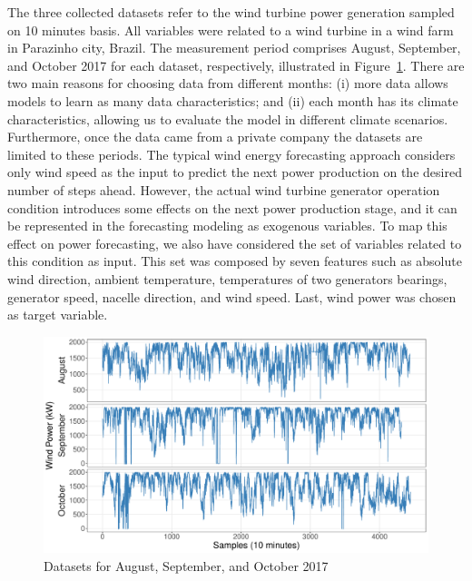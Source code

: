 The three collected datasets refer to the wind turbine power generation sampled on 10 minutes basis. All variables were related to a wind turbine in a wind farm in Parazinho city, Brazil. The measurement period comprises August, September, and October 2017 for each dataset, respectively, illustrated in Figure~\ref{fig:datasetscs1}. There are two main reasons for choosing data from different months: (i) more data allows models to learn as many data characteristics; and (ii) each month has its climate characteristics, allowing us to evaluate the model in different climate scenarios. Furthermore, once the data came from a private company the datasets are limited to these periods. The typical wind energy forecasting approach considers only wind speed as the input to predict the next power production on the desired number of steps ahead. However, the actual wind turbine generator operation condition introduces some effects on the next power production stage, and it can be represented in the forecasting modeling as exogenous variables. To map this effect on power forecasting, we also have considered the set of variables related to this condition as input. This set was composed by seven features such as absolute wind direction, ambient temperature, temperatures of two generators bearings, generator speed, nacelle direction, and wind speed. Last, wind power was chosen as target variable.

\begin{figure}[htb!]
    \centering
    \includegraphics[width=\linewidth]{Media/cs2_datasets_plot.pdf}
    \caption{Datasets for August, September, and October 2017}
    \label{fig:datasetscs1}
\end{figure}


